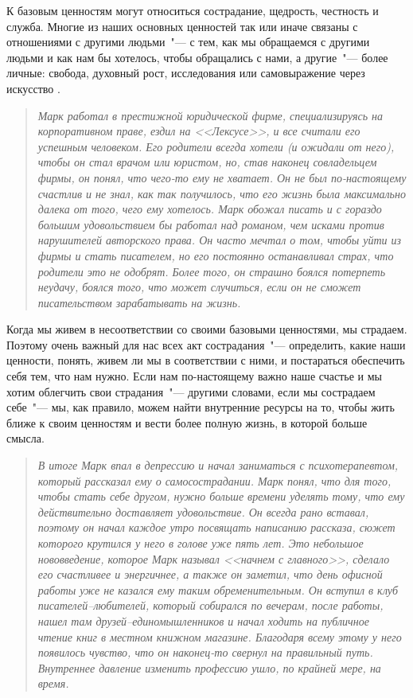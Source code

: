 К базовым ценностям могут относиться сострадание, щедрость, честность и служба. Многие из наших основных ценностей так или иначе связаны с отношениями с другими людьми~"--- с тем, как мы обращаемся с другими людьми и как нам бы хотелось, чтобы обращались с нами, а другие~"---  более личные: свобода, духовный рост, исследования или самовыражение через искусство \cite{83}. 

\begin{quotation}
	\textit{
		Марк работал в престижной юридической фирме, специализируясь на корпоративном праве, ездил на <<Лексусе>>, и все считали его успешным человеком. Его родители всегда хотели (и ожидали от него), чтобы он стал врачом или юристом, но, став наконец совладельцем фирмы, он понял, что чего-то ему не хватает.  Он не был по-настоящему счастлив и не знал, как так получилось, что его жизнь была максимально далека от того, чего ему хотелось. Марк обожал писать и с гораздо большим удовольствием бы работал над романом, чем исками против нарушителей авторского права.  Он часто мечтал о том, чтобы уйти из фирмы и стать писателем, но его постоянно останавливал страх, что родители это не одобрят. Более того, он страшно боялся потерпеть неудачу, боялся того, что может случиться, если он не сможет писательством зарабатывать на жизнь.
	} 
\end{quotation}

Когда мы живем в несоответствии со своими базовыми ценностями, мы страдаем. Поэтому очень важный для нас всех акт сострадания~"--- определить, какие наши ценности, понять, живем ли мы в соответствии с ними, и постараться обеспечить себя тем, что нам нужно. Если нам по-настоящему важно наше счастье и мы хотим облегчить свои страдания~"--- другими словами, если мы сострадаем себе~"--- мы, как правило, можем найти внутренние ресурсы на то, чтобы жить ближе к своим ценностям и вести более полную жизнь, в которой больше смысла. 

\begin{quotation}
	\textit{
		В итоге Марк впал в депрессию и начал заниматься с психотерапевтом, который рассказал ему о самосострадании. Марк понял, что для того, чтобы стать себе другом, нужно больше времени уделять тому, что ему действительно доставляет удовольствие. Он всегда рано вставал, поэтому он начал каждое утро посвящать написанию рассказа, сюжет которого крутился у него в голове уже пять лет. Это небольшое нововведение, которое Марк называл <<начнем с главного>>, сделало его счастливее и энергичнее, а также он заметил, что день офисной работы уже не казался ему таким обременительным. Он вступил в клуб писателей--любителей, который собирался по вечерам, после работы, нашел там друзей--единомышленников и начал ходить на публичное чтение книг в местном книжном магазине. Благодаря всему этому у него появилось чувство, что он наконец-то свернул на правильный путь. Внутреннее давление изменить профессию ушло, по крайней мере, на время.
	}
\end{quotation}


